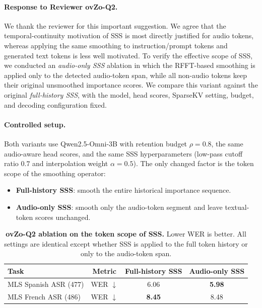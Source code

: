 \begin{answer}
    \paragraph{Response to Reviewer ovZo-Q2.}
    We thank the reviewer for this important suggestion.
    We agree that the temporal-continuity motivation of SSS is most directly justified for audio tokens, whereas applying the same smoothing to instruction/prompt tokens and generated text tokens is less well motivated.
    To verify the effective scope of SSS, we conducted an \emph{audio-only SSS} ablation in which the RFFT-based smoothing is applied only to the detected audio-token span, while all non-audio tokens keep their original unsmoothed importance scores.
    We compare this variant against the original \emph{full-history SSS}, with the model, head scores, SparseKV setting, budget, and decoding configuration fixed.

    \paragraph{Controlled setup.}
    Both variants use Qwen2.5-Omni-3B with retention budget $\rho=0.8$, the same audio-aware head scores, and the same SSS hyperparameters (low-pass cutoff ratio $0.7$ and interpolation weight $\alpha=0.5$).
    The only changed factor is the token scope of the smoothing operator:
    \begin{itemize}
        \item \textbf{Full-history SSS}: smooth the entire historical importance sequence.
        \item \textbf{Audio-only SSS}: smooth only the audio-token segment and leave textual-token scores unchanged.
    \end{itemize}

    \begin{table}[t]
    \centering
    \small
    \setlength{\tabcolsep}{5pt}
    \caption{\textbf{ovZo-Q2 ablation on the token scope of SSS.}
    Lower WER is better. All settings are identical except whether SSS is applied to the full token history or only to the audio-token span.}
    \label{tab:rebuttal-ovzo-q2-sss-scope}
    \begin{tabular}{lccc}
    \toprule
    \textbf{Task} & \textbf{Metric} & \textbf{Full-history SSS} & \textbf{Audio-only SSS} \\
    \midrule
    MLS Spanish ASR (477) & WER $\downarrow$ & 6.06 & \textbf{5.98} \\
    MLS French ASR (486) & WER $\downarrow$ & \textbf{8.45} & 8.48 \\
    \bottomrule
    \end{tabular}
    \end{table}


\end{answer}
